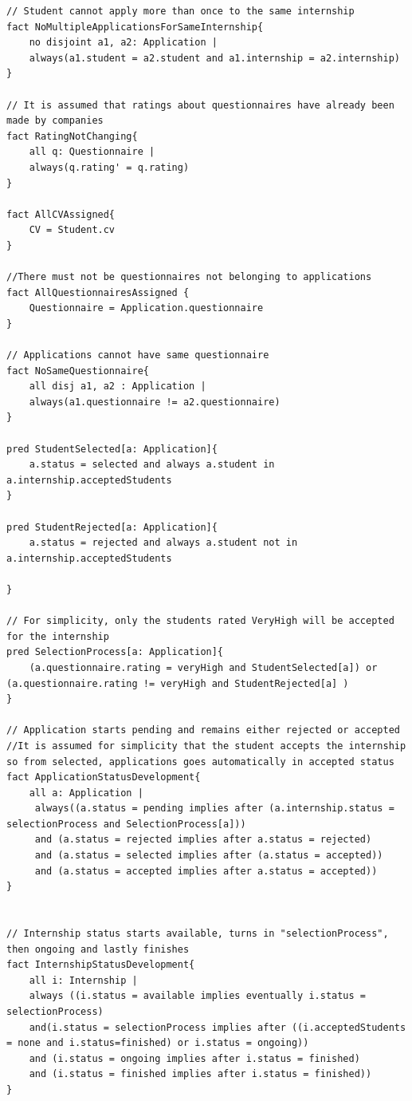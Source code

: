 \documentclass{article}
\begin{document}
\begin{lstlisting}[language=Alloy,label=lst:sigs]
// Student cannot apply more than once to the same internship
fact NoMultipleApplicationsForSameInternship{
	no disjoint a1, a2: Application | 
	always(a1.student = a2.student and a1.internship = a2.internship)
}

// It is assumed that ratings about questionnaires have already been made by companies
fact RatingNotChanging{
	all q: Questionnaire |
	always(q.rating' = q.rating)
}

fact AllCVAssigned{
	CV = Student.cv
}

//There must not be questionnaires not belonging to applications
fact AllQuestionnairesAssigned {
    Questionnaire = Application.questionnaire
}

// Applications cannot have same questionnaire
fact NoSameQuestionnaire{
	all disj a1, a2 : Application |
	always(a1.questionnaire != a2.questionnaire)
}

pred StudentSelected[a: Application]{
	a.status = selected and always a.student in a.internship.acceptedStudents
}

pred StudentRejected[a: Application]{
	a.status = rejected and always a.student not in a.internship.acceptedStudents

}

// For simplicity, only the students rated VeryHigh will be accepted for the internship
pred SelectionProcess[a: Application]{
	(a.questionnaire.rating = veryHigh and StudentSelected[a]) or (a.questionnaire.rating != veryHigh and StudentRejected[a] )
}

// Application starts pending and remains either rejected or accepted
//It is assumed for simplicity that the student accepts the internship so from selected, applications goes automatically in accepted status
fact ApplicationStatusDevelopment{
	all a: Application | 
	 always((a.status = pending implies after (a.internship.status = selectionProcess and SelectionProcess[a]))
	 and (a.status = rejected implies after a.status = rejected)
 	 and (a.status = selected implies after (a.status = accepted))
  	 and (a.status = accepted implies after a.status = accepted))
} 


// Internship status starts available, turns in "selectionProcess", then ongoing and lastly finishes
fact InternshipStatusDevelopment{
	all i: Internship |
	always ((i.status = available implies eventually i.status = selectionProcess)
	and(i.status = selectionProcess implies after ((i.acceptedStudents = none and i.status=finished) or i.status = ongoing))
	and (i.status = ongoing implies after i.status = finished)
	and (i.status = finished implies after i.status = finished))
}



\end{lstlisting}
\end{document}
